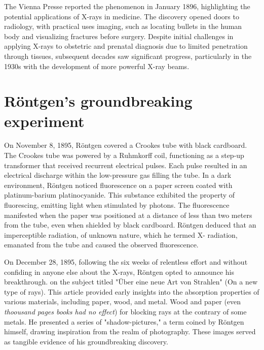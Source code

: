 \documentclass[a4paper,12pt]{report}
\begin{document}
The Vienna Presse reported the phenomenon in January 1896, highlighting the potential
applications of X-rays in medicine. The discovery opened doors to radiology, with practical uses
imaging, such as locating bullets in the human body and visualizing fractures before surgery.
Despite initial challenges in applying X-rays to obstetric  and prenatal diagnosis due to limited
penetration through tissues, subsequent decades saw significant progress, particularly in the
1930s with the development of more powerful X-ray beams.

\section{Röntgen's groundbreaking experiment}

On November 8, 1895, Röntgen covered a Crookes tube with black cardboard. The Crookes tube
was powered by a Ruhmkorff coil, functioning as a step-up transformer that received recurrent
electrical pulses. Each pulse resulted in an electrical discharge within the low-pressure gas filling
the tube. In a dark environment, Röntgen noticed fluorescence on a paper screen coated with
platinum-barium platinocyanide. This substance exhibited the property of fluorescing, emitting
light when stimulated by photons. The fluorescence manifested when the paper was positioned at
a distance of less than two meters from the tube, even when shielded by black cardboard.
Röntgen deduced that an imperceptible radiation, of unknown nature, which he termed X-
radiation, emanated from the tube and caused the observed fluorescence.


On December 28, 1895, following the six weeks of relentless effort and without confiding in
anyone else about the X-rays, Röntgen opted to announce his breakthrough. on the subject titled
"Über eine neue Art von Strahlen" (On a new type of rays). This article provided early insights
into the absorption properties of various materials, including paper, wood, and metal. Wood and paper (even \textit{thoousand pages books had no effect}) for blocking rays at the contrary of some metals. He
presented a series of "shadow-pictures," a term coined by Röntgen himself, drawing inspiration
from the realm of photography. These images served as tangible evidence of his groundbreaking
discovery.
\end{document}
